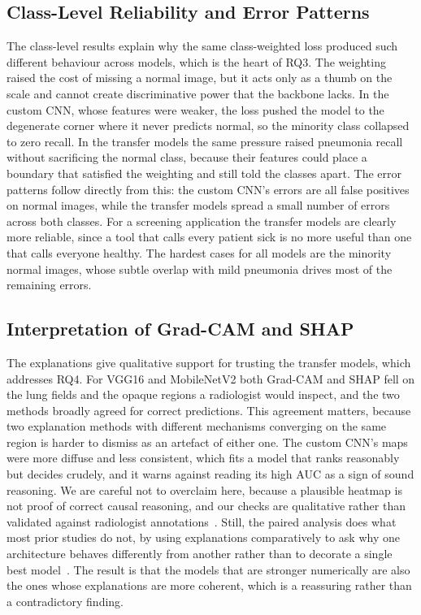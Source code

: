 \documentclass[preprint,12pt]{elsarticle}
\begin{document}
\subsection{Class-Level Reliability and Error Patterns}
The class-level results explain why the same class-weighted loss produced such different behaviour across models, which is the heart of RQ3.
The weighting raised the cost of missing a normal image, but it acts only as a thumb on the scale and cannot create discriminative power that the backbone lacks.
In the custom CNN, whose features were weaker, the loss pushed the model to the degenerate corner where it never predicts normal, so the minority class collapsed to zero recall.
In the transfer models the same pressure raised pneumonia recall without sacrificing the normal class, because their features could place a boundary that satisfied the weighting and still told the classes apart.
The error patterns follow directly from this: the custom CNN's errors are all false positives on normal images, while the transfer models spread a small number of errors across both classes.
For a screening application the transfer models are clearly more reliable, since a tool that calls every patient sick is no more useful than one that calls everyone healthy.
The hardest cases for all models are the minority normal images, whose subtle overlap with mild pneumonia drives most of the remaining errors.

\subsection{Interpretation of Grad-CAM and SHAP}
The explanations give qualitative support for trusting the transfer models, which addresses RQ4.
For VGG16 and MobileNetV2 both Grad-CAM and SHAP fell on the lung fields and the opaque regions a radiologist would inspect, and the two methods broadly agreed for correct predictions.
This agreement matters, because two explanation methods with different mechanisms converging on the same region is harder to dismiss as an artefact of either one.
The custom CNN's maps were more diffuse and less consistent, which fits a model that ranks reasonably but decides crudely, and it warns against reading its high AUC as a sign of sound reasoning.
We are careful not to overclaim here, because a plausible heatmap is not proof of correct causal reasoning, and our checks are qualitative rather than validated against radiologist annotations~\cite{bhatia2024evaluating}.
Still, the paired analysis does what most prior studies do not, by using explanations comparatively to ask why one architecture behaves differently from another rather than to decorate a single best model~\cite{du2023classification,mahamud2024explainable}.
The result is that the models that are stronger numerically are also the ones whose explanations are more coherent, which is a reassuring rather than a contradictory finding.
\end{document}

